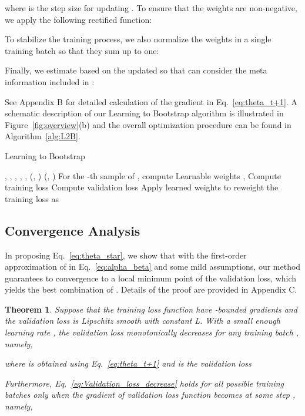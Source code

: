 \documentclass{article}
\newtheorem{theorem}{Theorem}
\begin{document}
where  is the step size for updating . To ensure that the weights are non-negative, we apply the following rectified function:

To stabilize the training process, we also normalize the weights in a single training batch so that they sum up to one: 

Finally, we estimate  based on the updated  so that  can consider the meta information included in :


See Appendix B for detailed calculation of the gradient in Eq.~\eqref{eq:theta_t+1}. 
A schematic description of our Learning to Bootstrap algorithm is illustrated in Figure~\ref{fig:overview}(b) and the overall optimization procedure can be found in Algorithm~\ref{alg:L2B}.


\begin{algorithm}[t!]
\caption{Learning to Bootstrap}
\label{alg:L2B}
\begin{algorithmic}[1]
\REQUIRE , , , , , 
\ENSURE 
{}
\STATE  {}(, )
\STATE  {}(, )
\STATE For the -th sample of , compute  
\STATE Learnable weights , 
\STATE Compute training loss 
\STATE 
\STATE Compute validation loss 
\STATE 
\STATE 
\STATE 
\STATE Apply learned weights  to reweight the training loss as 
\STATE  
\ENDFOR
\end{algorithmic}
\end{algorithm}


\subsection{Convergence Analysis} 
In proposing Eq.~\eqref{eq:theta_star}, we show that with the first-order approximation of  in Eq.~\eqref{eq:alpha_beta} and some mild assumptions, our method guarantees to convergence to a local minimum point of the validation loss, which yields the best combination of . 
Details of the proof are provided in Appendix C. 

\begin{theorem}
\label{theorem:convergence}
Suppose that the training loss function  have -bounded gradients and the validation loss  is Lipschitz smooth with constant L. With a small enough learning rate , the validation loss monotonically decreases for any training batch , namely, 

where  is obtained using Eq.~\eqref{eq:theta_t+1} and  is the validation loss


Furthermore, Eq.~\eqref{eq:Validation_loss_decrease} holds for all possible training batches only when the gradient of validation loss function becomes  at some step , namely, 
\end{theorem}
\end{document}
